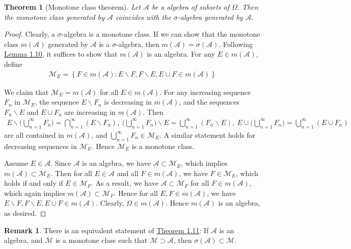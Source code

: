 \documentclass{article}
\numberwithin{equation}{section}
\theoremstyle{plain}
\newtheorem{theorem}{Theorem}[section]
\theoremstyle{definition}
\newtheorem*{remark}{Remark}
\begin{document}
\begin{theorem}[Monotone class theorem]\label{thm:1.11} Let $\mathscr{A}$ be a algebra of subsets of $\Omega$. Then the monotone class generated by $\mathscr{A}$ coincides with the $\sigma$-algebra generated by $\mathscr{A}$.
\end{theorem}
\begin{proof}
Clearly, a $\sigma$-algebra is a monotone class. If we can show that the monotone class $m(\mathscr{A})$ generated by $\mathscr{A}$ is a $\sigma$-algebra, then $m(\mathscr{A})=\sigma(\mathscr{A})$. Following \hyperref[lemma:1.10]{Lemma 1.10}, it suffices to show that $m(\mathscr{A})$ is an algebra. For any $E\in m(\mathscr{A})$, define
\begin{align*}
	\mathscr{M}_E = \left\{F\in m(\mathscr{A}): E\backslash F,F\backslash E,E\cup F\in m(\mathscr{A})\right\}
\end{align*}

We claim that $\mathscr{M}_E=m(\mathscr{A})$ for all $E\in m(\mathscr{A})$. For any increasing sequence $F_n$ in $\mathscr{M}_E$, the sequence $E\backslash F_n$ is decreasing in $m(\mathscr{A})$, and the sequences $F_n\backslash E$ and $E\cup F_n$ are increasing in $m(\mathscr{A})$. Then
\begin{align*}
	E\backslash\biggl(\bigcup_{n=1}^\infty F_n\biggr) = \bigcap_{n=1}^\infty (E\backslash F_n),\ \biggl(\bigcup_{n=1}^\infty F_n\biggr)\backslash E = \bigcup_{n=1}^\infty (F_n\backslash E),\ E\cup \biggl(\bigcup_{n=1}^\infty F_n\biggr)=\bigcup_{n=1}^\infty (E\cup F_n)
\end{align*} 
are all contained in $m(\mathscr{A})$, and $\bigcup_{n=1}^\infty F_n\in \mathscr{M}_E$. A similar statement holds for decreasing sequences in $\mathscr{M}_E$. Hence $\mathscr{M}_E$ is a monotone class. 

Assume $E\in\mathscr{A}$. Since $\mathscr{A}$ is an algebra, we have $\mathscr{A}\subset\mathscr{M}_E$, which implies $m(\mathscr{A})\subset\mathscr{M}_E$. Then for all $E\in\mathscr{A}$ and all $F\in m(\mathscr{A})$, we have $F\in\mathscr{M}_E$, which holds if and only if $E\in\mathscr{M}_F$. As a result, we have $\mathscr{A}\subset\mathscr{M}_F$ for all $F\in m(\mathscr{A})$, which again implies $m(\mathscr{A})\subset\mathscr{M}_F$. Hence for all $E,F\in m(\mathscr{A})$, we have $E\backslash F,F\backslash E,E\cup F\in m(\mathscr{A})$. Clearly, $\Omega\in m(\mathscr{A})$. Hence $m(\mathscr{A})$ is an algebra, as desired.
\end{proof}
\begin{remark} There is an equivalent statement of \hyperref[thm:1.11]{Theorem 1.11}: If $\mathscr{A}$ is an algebra, and $\mathscr{M}$ is a monotone class such that $\mathscr{M}\supset\mathscr{A}$, then $\sigma(\mathscr{A})\subset\mathscr{M}$.
\end{remark}
\end{document}
